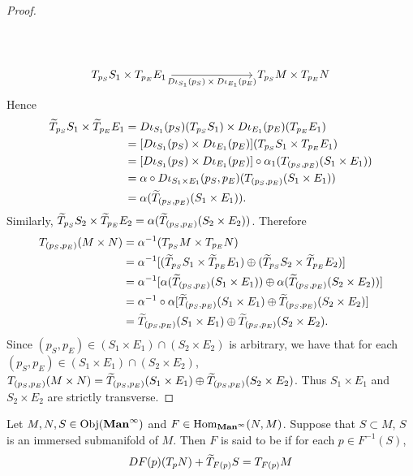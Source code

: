 \documentclass{book}
\begin{document}
\begin{proof}
\[\begin{tikzcd}
			& \\
			& \\
			\text{$T_{p_S}S_1 \times T_{p_E}E_1$} \arrow[rrr, "\text{$D\iota_{S_1}(p_S) \times D\iota_{E_1}(p_E)$}"'] &&&  \text{$T_{p_S}M \times T_{p_E}N$}
		\end{tikzcd}
		\]
		Hence 
		\begin{align*}
			\widetilde{T}_{p_S}S_1 \times \widetilde{T}_{p_E}E_1 
			 & = D\iota_{S_1}(p_S)(T_{p_S}S_1) \times D\iota_{E_1}(p_E)(T_{p_E}E_1) \\
			 & = [D\iota_{S_1}(p_S) \times D\iota_{E_1}(p_E)](T_{p_S}S_1 \times T_{p_E}E_1) \\
			 & = [D\iota_{S_1}(p_S) \times D\iota_{E_1}(p_E)] \circ \alpha_1 (T_{(p_S, p_E)} (S_1 \times E_1)) \\
			 & = \alpha \circ D \iota_{S_1 \times E_1}(p_S , p_E) (T_{(p_S, p_E)} (S_1 \times E_1)) \\
			 & = \alpha (\widetilde{T}_{(p_S, p_E)} (S_1 \times E_1)).
		\end{align*}
		Similarly, $\widetilde{T}_{p_S}S_2 \times \widetilde{T}_{p_E}E_2 = \alpha (\widetilde{T}_{(p_S, p_E)} (S_2 \times E_2))$. Therefore
		\begin{align*}
			T_{(p_S, p_E)}(M \times N)
			& = \alpha^{-1}(T_{p_S}M \times T_{p_E}N) \\
			& = \alpha^{-1}[(\widetilde{T}_{p_S} S_1 \times \widetilde{T}_{p_E} E_1) \oplus (\widetilde{T}_{p_S} S_2 \times \widetilde{T}_{p_E} E_2 )] \\
			& = \alpha^{-1}[\alpha (\widetilde{T}_{(p_S, p_E)} (S_1 \times E_1)) \oplus \alpha (\widetilde{T}_{(p_S, p_E)} (S_2 \times E_2))] \\
			& = \alpha^{-1} \circ \alpha [\widetilde{T}_{(p_S, p_E)} (S_1 \times E_1) \oplus  \widetilde{T}_{(p_S, p_E)} (S_2 \times E_2)] \\
			& = \widetilde{T}_{(p_S, p_E)} (S_1 \times E_1) \oplus  \widetilde{T}_{(p_S, p_E)} (S_2 \times E_2).
		\end{align*}
		Since $(p_S, p_E) \in (S_1 \times E_1) \cap (S_2 \times E_2) $ is arbitrary, we have that for each $(p_S, p_E) \in (S_1 \times E_1) \cap (S_2 \times E_2)$, $T_{(p_S, p_E)}(M \times N) = \widetilde{T}_{(p_S, p_E)} (S_1 \times E_1) \oplus  \widetilde{T}_{(p_S, p_E)} (S_2 \times E_2)$. Thus $S_1 \times E_1$ and $S_2 \times E_2$ are strictly transverse.
	\end{proof}

	\begin{defn} 
		Let $M, N, S \in \operatorname{Obj}(\operatorname*{\text{\textbf{Man}}^{\infty}})$ and $F \in \operatorname{Hom}_{\operatorname*{\text{\textbf{Man}}^{\infty}}}(N, M)$. Suppose that $S \subset M$, $S$ is an immersed submanifold of $M$. Then $F$ is said to be  if for each $p \in F^{-1}(S)$, 
		$$DF(p)(T_pN) + \widetilde{T}_{F(p)}S = T_{F(p)}M$$
	\end{defn}
\end{document}
